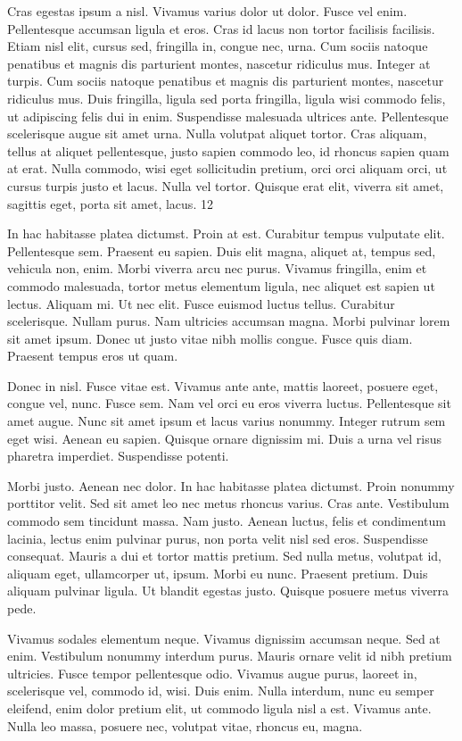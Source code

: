 \documentclass{article}
\begin{document}
Cras egestas ipsum a nisl. Vivamus varius dolor ut dolor. Fusce vel enim.
Pellentesque accumsan ligula et eros. Cras id lacus non tortor facilisis
facilisis. Etiam nisl elit, cursus sed, fringilla in, congue nec, urna. Cum
sociis natoque penatibus et magnis dis parturient montes, nascetur ridiculus
mus. Integer at turpis. Cum sociis natoque penatibus et magnis dis parturient
montes, nascetur ridiculus mus. Duis fringilla, ligula sed porta fringilla,
ligula wisi commodo felis, ut adipiscing felis dui in enim. Suspendisse
malesuada ultrices ante. Pellentesque scelerisque augue sit amet urna. Nulla
volutpat aliquet tortor. Cras aliquam, tellus at aliquet pellentesque, justo
sapien commodo leo, id rhoncus sapien quam at erat. Nulla commodo, wisi eget
sollicitudin pretium, orci orci aliquam orci, ut cursus turpis justo et lacus.
Nulla vel tortor. Quisque erat elit, viverra sit amet, sagittis eget, porta sit
amet, lacus. 12

In hac habitasse platea dictumst. Proin at est. Curabitur tempus vulputate
elit. Pellentesque sem. Praesent eu sapien. Duis elit magna, aliquet at, tempus
sed, vehicula non, enim. Morbi viverra arcu nec purus. Vivamus fringilla, enim
et commodo malesuada, tortor metus elementum ligula, nec aliquet est sapien ut
lectus. Aliquam mi. Ut nec elit. Fusce euismod luctus tellus. Curabitur
scelerisque. Nullam purus. Nam ultricies accumsan magna. Morbi pulvinar lorem
sit amet ipsum. Donec ut justo vitae nibh mollis congue. Fusce quis diam.
Praesent tempus eros ut quam.

Donec in nisl. Fusce vitae est. Vivamus ante ante, mattis laoreet, posuere
eget, congue vel, nunc. Fusce sem. Nam vel orci eu eros viverra luctus.
Pellentesque sit amet augue. Nunc sit amet ipsum et lacus varius nonummy.
Integer rutrum sem eget wisi. Aenean eu sapien. Quisque ornare dignissim mi.
Duis a urna vel risus pharetra imperdiet. Suspendisse potenti.

Morbi justo. Aenean nec dolor. In hac habitasse platea dictumst. Proin
nonummy porttitor velit. Sed sit amet leo nec metus rhoncus varius. Cras ante.
Vestibulum commodo sem tincidunt massa. Nam justo. Aenean luctus, felis et
condimentum lacinia, lectus enim pulvinar purus, non porta velit nisl sed eros.
Suspendisse consequat. Mauris a dui et tortor mattis pretium. Sed nulla metus,
volutpat id, aliquam eget, ullamcorper ut, ipsum. Morbi eu nunc. Praesent
pretium. Duis aliquam pulvinar ligula. Ut blandit egestas justo. Quisque
posuere metus viverra pede.

Vivamus sodales elementum neque. Vivamus dignissim accumsan neque. Sed at
enim. Vestibulum nonummy interdum purus. Mauris ornare velit id nibh pretium
ultricies. Fusce tempor pellentesque odio. Vivamus augue purus, laoreet in,
scelerisque vel, commodo id, wisi. Duis enim. Nulla interdum, nunc eu semper
eleifend, enim dolor pretium elit, ut commodo ligula nisl a est. Vivamus ante.
Nulla leo massa, posuere nec, volutpat vitae, rhoncus eu, magna.
\end{document}
